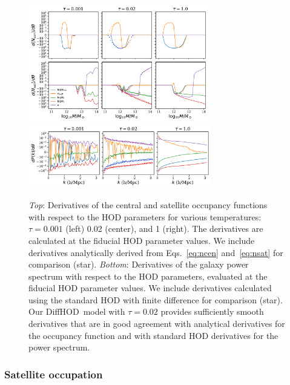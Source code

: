 \documentclass[a4paper,usenatbib]{mnras}
\newcommand{\dhod}{{\sc DiffHOD}}
\begin{document}
\begin{figure}
    \centering
    \includegraphics[width=0.70\textwidth]{paper/plots/3panel.pdf}
    \includegraphics[width=0.71\textwidth]{paper/plots/ps_comparison.pdf}
    \caption{
    \emph{Top}: Derivatives of the central and satellite occupancy functions 
    with respect to the HOD parameters for various temperatures: $\tau=0.001$ 
    (left) 0.02 (center), and 1 (right). 
    The derivatives are calculated at the fiducial HOD parameter values. 
    We include derivatives analytically derived from Eqs.~\ref{eq:ncen} 
    and~\ref{eq:nsat} for comparison (star). 
    \emph{Bottom}: Derivatives of the galaxy power spectrum with respect to the 
    HOD parameters, evaluated at the fiducial HOD parameter values. 
    We include derivatives calculated using the standard HOD with finite 
    difference for comparison (star). 
    Our \dhod~model with $\tau=0.02$ provides sufficiently smooth derivatives that
    are in good agreement with analytical derivatives for the occupancy function 
    and with standard HOD derivatives for the power spectrum.
    \label{fig:occupancy_derivatives}}
\end{figure}
\subsubsection{Satellite occupation}
\end{document}
